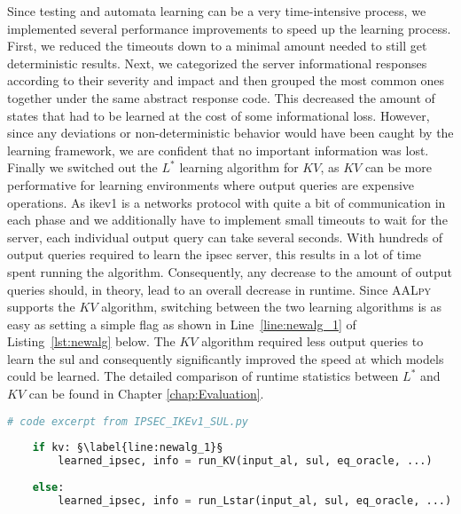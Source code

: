 Since testing and automata learning can be a very time-intensive process, we implemented several performance improvements to speed up the learning process. First, we reduced the timeouts down to a minimal amount needed to still get deterministic results. Next, we categorized the server informational responses according to their severity and impact and then grouped the most common ones together under the same abstract response code. This decreased the amount of states that had to be learned at the cost of some informational loss. However, since any deviations or non-deterministic behavior would have been caught by the learning framework, we are confident that no important information was lost. Finally we switched out the $L^*$ learning algorithm for $KV$, as $KV$ can be more performative for learning environments where output queries are expensive operations. As \ac{ike}v1 is a networks protocol with quite a bit of communication in each phase and we additionally have to implement small timeouts to wait for the server, each individual output query can take several seconds. With hundreds of output queries required to learn the \ac{ipsec} server, this results in a lot of time spent running the algorithm. Consequently, any decrease to the amount of output queries should, in theory, lead to an overall decrease in runtime. Since \textsc{AALpy} supports the $KV$ algorithm, switching between the two learning algorithms is as easy as setting a simple flag as shown in Line~\ref{line:newalg_1} of Listing~\ref{lst:newalg} below. The $KV$ algorithm required less output queries to learn the \ac{sul} and consequently significantly improved the speed at which models could be learned. The detailed comparison of runtime statistics between $L^*$ and $KV$ can be found in Chapter \ref{chap:Evaluation}.

\begin{lstlisting}[float=ht, caption=Switching learning algorithms in code., label=lst:newalg, language=python, escapechar=§]
	# code excerpt from IPSEC_IKEv1_SUL.py
	
	if kv: §\label{line:newalg_1}§
		learned_ipsec, info = run_KV(input_al, sul, eq_oracle, ...)
	
	else:
		learned_ipsec, info = run_Lstar(input_al, sul, eq_oracle, ...)
\end{lstlisting}


